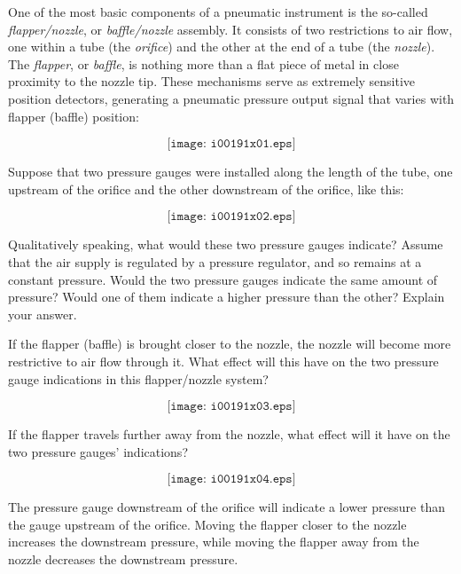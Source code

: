 

One of the most basic components of a pneumatic instrument is the so-called {\it flapper/nozzle}, or {\it baffle/nozzle} assembly.  It consists of two restrictions to air flow, one within a tube (the {\it orifice}) and the other at the end of a tube (the {\it nozzle}).  The {\it flapper}, or {\it baffle}, is nothing more than a flat piece of metal in close proximity to the nozzle tip.  These mechanisms serve as extremely sensitive position detectors, generating a pneumatic pressure output signal that varies with flapper (baffle) position:

$$\texttt{[image: i00191x01.eps]}$$

Suppose that two pressure gauges were installed along the length of the tube, one upstream of the orifice and the other downstream of the orifice, like this:

$$\texttt{[image: i00191x02.eps]}$$

Qualitatively speaking, what would these two pressure gauges indicate?  Assume that the air supply is regulated by a pressure regulator, and so remains at a constant pressure.  Would the two pressure gauges indicate the same amount of pressure?  Would one of them indicate a higher pressure than the other?  Explain your answer.

\vskip 10pt

If the flapper (baffle) is brought closer to the nozzle, the nozzle will become more restrictive to air flow through it.  What effect will this have on the two pressure gauge indications in this flapper/nozzle system?

$$\texttt{[image: i00191x03.eps]}$$

\vskip 10pt

If the flapper travels further away from the nozzle, what effect will it have on the two pressure gauges' indications?

$$\texttt{[image: i00191x04.eps]}$$







The pressure gauge downstream of the orifice will indicate a lower pressure than the gauge upstream of the orifice.  Moving the flapper closer to the nozzle increases the downstream pressure, while moving the flapper away from the nozzle decreases the downstream pressure.

